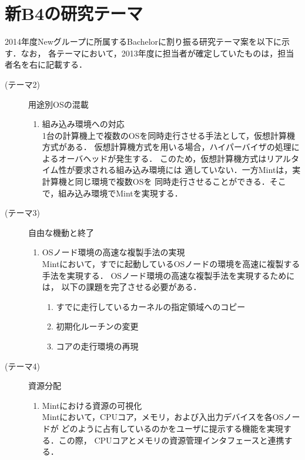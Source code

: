 \documentclass[12pt]{jsarticle}
\begin{document}
\section{新B4の研究テーマ}
2014年度Newグループに所属するBachelorに割り振る研究テーマ案を以下に示す．なお，
各テーマにおいて，2013年度に担当者が確定していたものは，担当者名を右に記載する．
\begin{description}
    \item[(テーマ2)]用途別OSの混載
        \begin{enumerate}
            \item 組み込み環境への対応\\
                1台の計算機上で複数のOSを同時走行させる手法として，仮想計算機方式がある．
                仮想計算機方式を用いる場合，ハイパーバイザの処理によるオーバヘッドが発生する．
                このため，仮想計算機方式はリアルタイム性が要求される組み込み環境には
                適していない．一方Mintは，実計算機と同じ環境で複数OSを
                同時走行させることができる．そこで，組み込み環境でMintを実現する．
        \end{enumerate}
    \item[(テーマ3)]自由な機動と終了
        \begin{enumerate}
            \item OSノード環境の高速な複製手法の実現\\
                Mintにおいて，すでに起動しているOSノードの環境を高速に複製する手法を実現する．
                OSノード環境の高速な複製手法を実現するためには，
                以下の課題を完了させる必要がある．
                \begin{enumerate}
                    \item すでに走行しているカーネルの指定領域へのコピー
                    \item 初期化ルーチンの変更
                    \item コアの走行環境の再現
                \end{enumerate}
        \end{enumerate}
    \item[(テーマ4)]資源分配
        \begin{enumerate}
            \item Mintにおける資源の可視化\\
                Mintにおいて，CPUコア，メモリ，および入出力デバイスを各OSノードが
                どのように占有しているのかをユーザに提示する機能を実現する．この際，
                CPUコアとメモリの資源管理インタフェースと連携する．

\end{enumerate}
\end{description}
\end{document}

